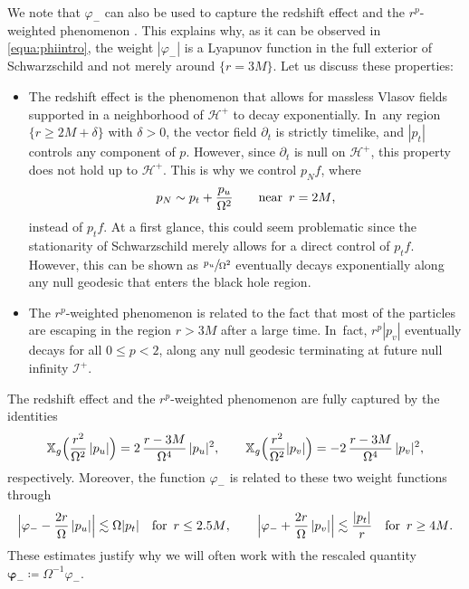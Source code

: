 \documentclass[10pt]{amsart}
\theoremstyle{plain}
\theoremstyle{definition}
\newcommand\T{{\mathbb{X}}}
\renewcommand\H{{\mathcal{H}^+}}
\begin{document}
We note that $\varphi_-$ can also be used to capture the redshift effect \cite{DR09} and the $r^p$-weighted phenomenon \cite{DR10}. This explains why, as it can be observed in \eqref{equa:phiintro}, the weight $|\varphi_-|$ is a Lyapunov function in the full exterior of Schwarzschild and not merely around $\{r=3M\}$. Let us discuss these properties:
\begin{itemize}
\item The redshift effect is the phenomenon that allows for massless Vlasov fields supported in a neighborhood of $\mathcal{H}^+$ to decay exponentially. In~any region $\{r \geq 2M+\delta\}$ with $\delta>0$, the vector field $\partial_t$ is strictly timelike, and $|p_t|$ controls any component of $p$. However, since $\partial_t$ is null on $\mathcal{H}^+$, this property does not hold up to $\H$. This is why we control $p_N f$, where
\[
p_N \sim p_t+\frac{p_u}{\Omega^2} \qquad \text{near \,$r=2M$,}
\]
instead of $p_t f$. At a first glance, this could seem problematic since the stationarity of Schwarzschild merely allows for a direct control of $p_t f$. However, this can be shown as $\sfrac{p_u}{\Omega^2}$ eventually decays exponentially along any null geodesic that enters the black hole region.
\item The $r^p$-weighted phenomenon is related to the fact that most of the particles are escaping in the region $r > 3M$ after a large time. In~fact, $r^p |p_v|$ eventually decays for all $0 \leq p <2$, along any null geodesic terminating at future null infinity $\mathcal{I}^+$.
\end{itemize}

The redshift effect and the $r^p$-weighted phenomenon are fully captured by the identities
\begin{align*}
\T_g \Bigl(\frac{r^2}{\Omega^2}\, |p_u| \Bigr) = 2\,\frac{r-3M}{\Omega^4}\,|p_u|^2,\qquad \T_g \Bigl(\frac{r^2}{\Omega^2} |p_v| \Bigr) = -2\,\frac{r-3M}{\Omega^4}\,|p_v|^2,
\end{align*}
respectively. Moreover, the function $\varphi_-$ is related to these two weight functions through
\begin{align*}
\Big|\varphi_-- \frac{2r}{\Omega}\,|p_u| \Big| \lesssim \Omega |p_t| \quad \text{for \,$r \leq 2.5M$},\qquad \Big| \varphi_-+\frac{2r}{\Omega}\,|p_v|\Big| \lesssim \frac{|p_t|}{r} \quad \text{for \,$r \geq 4M$}.
\end{align*}
These estimates justify why we will often work with the rescaled quantity $\pmb{\varphi}_- \coloneqq \Omega^{-1} \varphi_-$.
\end{document}
